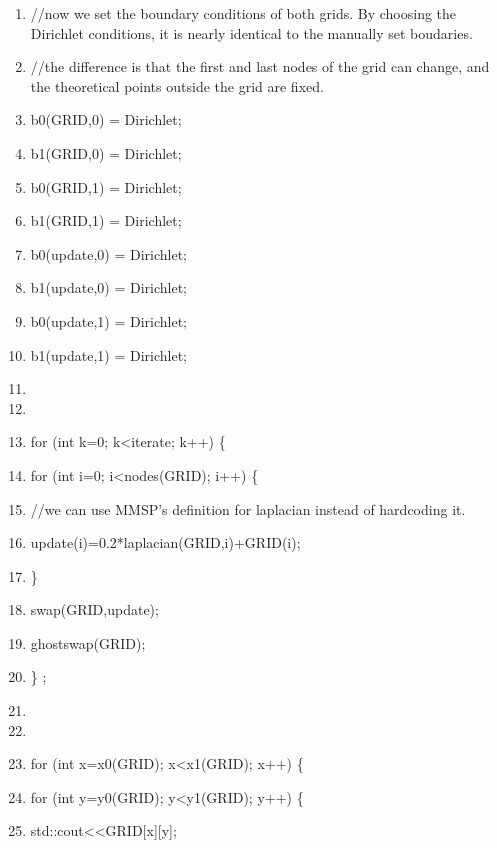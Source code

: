 \documentclass{article}
\begin{document}
\begin{shadebox}
\begin{enumerate} \itemsep1pt \parskip0pt 
\setcounter{enumi}{35}
\item //now we set the boundary conditions of both grids.  By choosing the Dirichlet conditions, it is nearly identical to the manually set boudaries.  
\item //the difference is that the first and last nodes of the grid can change, and the theoretical points outside the grid are fixed.
\item b0(GRID,0) = Dirichlet;
\item b1(GRID,0) = Dirichlet;
\item b0(GRID,1) = Dirichlet;
\item b1(GRID,1) = Dirichlet;
\item b0(update,0) = Dirichlet;
\item b1(update,0) = Dirichlet;
\item b0(update,1) = Dirichlet;
\item b1(update,1) = Dirichlet;
\item 
\item 
\item for (int k=0; k\textless iterate; k++) \{
\item \hspace{10pt}         for (int i=0; i\textless nodes(GRID); i++) \{
\item //we can use MMSP's definition for laplacian instead of hardcoding it.
\item \hspace{10pt} \hspace{10pt}                 update(i)=0.2*laplacian(GRID,i)+GRID(i);
\item \hspace{10pt}         \}
\item \hspace{10pt}         swap(GRID,update);
\item \hspace{10pt}         ghostswap(GRID);
\item \} ;
\item 
\item 
\item for (int x=x0(GRID); x\textless x1(GRID); x++) \{
\item \hspace{10pt}         for (int y=y0(GRID); y\textless y1(GRID); y++) \{
\item \hspace{10pt} \hspace{10pt}         std::cout\textless \textless GRID[x][y];

\end{enumerate}
\end{shadebox}
\end{document}
